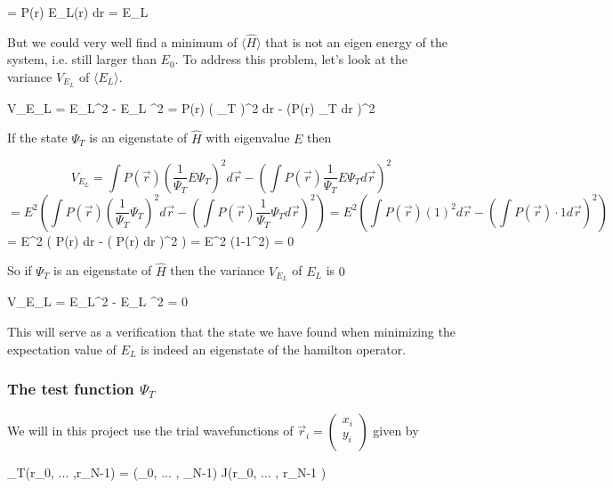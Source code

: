 \eqs
\langle {} \rangle = \int P(\vec r) E_L(\vec r) d\vec r = \langle E_L \rangle
\eqf

But we could very well find a minimum of $\langle \hat{H} \rangle$ that is not an eigen energy of the system, i.e. still larger than $E_0$.
To address this problem, let's look at the variance $V_{E_L}$ of $\langle E_L \rangle$. 

\eqs
V_{E_L} = \langle E_L^2 \rangle - \langle E_L \rangle^2
= 
\int P(\vec r) \left (  \Psi_T \right )^2 d\vec r -
\left (\int P(\vec r)   \Psi_T d\vec r \right )^2
\eqf 

If the state $\Psi_T$ is an eigenstate of $\hat{H}$ with eigenvalue $E$ then 

\[
V_{E_L} = \int P(\vec r) \left (\frac{1}{\Psi_T} E \Psi_T \right )^2 d\vec r -
\left (\int P(\vec r) \frac{1}{\Psi_T} E \Psi_T d\vec r \right )^2
\]
\[
=E^2
\left ( 
\int P(\vec r) \left (\frac{1}{\Psi_T} \Psi_T \right )^2 d\vec r -
\left (\int P(\vec r) \frac{1}{\Psi_T} \Psi_T d\vec r \right )^2
\right ) = 
E^2 
\left ( 
\int P(\vec r) (1)^2 d\vec r -
\left ( \int P(\vec r) \cdot 1 d\vec r \right )^2
\right )
\]
\eqs
=
E^2 
\left ( 
\int P(\vec r) d\vec r -
\left ( \int P(\vec r) d\vec r \right )^2
\right ) = E^2 (1-1^2) = 0
\eqf

So if $\Psi_T$ is an eigenstate of $\hat{H}$ then the variance $V_{E_L}$ of $E_L$ is $0$

\eqs
V_{E_L} = \langle E_L^2 \rangle - \langle E_L \rangle^2 = 0
\eqf 

This will serve as a verification that the state we have found when minimizing the expectation value of $E_L$ is indeed an eigenstate of the hamilton operator. 










\subsubsection{The test function $\Psi_T$}

We will in this project use the trial wavefunctions of $\vec r_i = \left ( \begin{matrix} x_i \\ y_i \\ \end{matrix}\right )$ given by 

\eqs
\Psi_T(\vec r_0, ... ,\vec r_{N-1})  = \Det(\phi_0,  ... , \phi_{N-1}) \cdot \textrm{J}(\vec r_0, ... , \vec r_{N-1} )
\eqf

